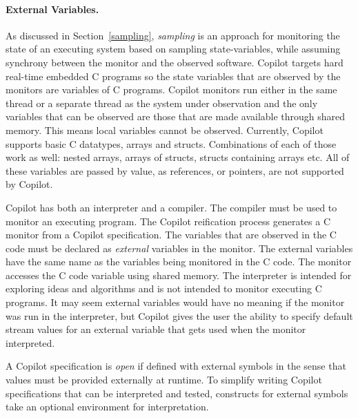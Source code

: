 \paragraph{External Variables.}


As discussed in Section~\ref{sampling}, \emph{sampling} is an approach
for monitoring the state of an executing system based on sampling
state-variables, while assuming synchrony between the monitor and the
observed software. Copilot targets hard real-time embedded C programs
so the state variables that are observed by the monitors are variables
of C programs. Copilot monitors run either in the same thread or a
separate thread as the system under observation and the only variables
that can be observed are those that are made available through shared
memory. This means local variables cannot be observed. Currently,
Copilot supports basic C datatypes, arrays and structs. Combinations of each of
those work as well: nested arrays, arrays of structs, structs containing arrays
etc. All of these variables are passed by value, as references, or pointers,
are not supported by Copilot.


Copilot has both an interpreter and a compiler. The compiler must be
used to monitor an executing program. The Copilot reification process
generates a C monitor from a Copilot specification. The variables that
are observed in the C code must be declared as \emph{external}
variables in the monitor. The external variables have the same name as
the variables being monitored in the C code.  The monitor accesses the C code 
variable using shared memory. The interpreter is intended for exploring ideas and algorithms
and is not intended to monitor executing  C
programs. It may seem external variables would have no meaning if the
monitor was run in the interpreter, but Copilot gives the user the
ability to specify default stream values for an external variable that
gets used when the monitor interpreted.

 A Copilot specification is \emph{open} if defined with external symbols in the
sense that values must be provided externally at runtime.  To simplify writing
Copilot specifications that can be interpreted and tested, constructs for
external symbols take an optional environment for interpretation.

